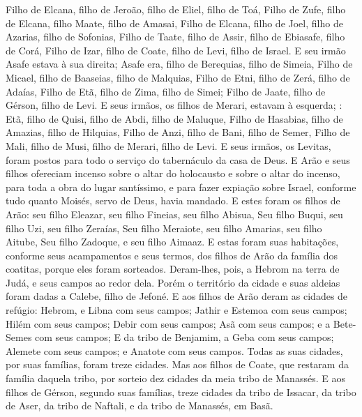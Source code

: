 {  Filho de Elcana, filho de Jeroão, filho de Eliel, filho de Toá,
  Filho de Zufe, filho de Elcana, filho Maate, filho de Amasai,
  Filho de Elcana, filho de Joel, filho de Azarias, filho de Sofonias,
  Filho de Taate, filho de Assir, filho de Ebiasafe, filho de Corá,
  Filho de Izar, filho de Coate, filho de Levi, filho de Israel.
  E seu irmão Asafe estava à sua direita; Asafe era, filho de Berequias, filho de Simeia,
  Filho de Micael, filho de Baaseias, filho de Malquias,
  Filho de Etni, filho de Zerá, filho de Adaías,
  Filho de Etã, filho de Zima, filho de Simei;
  Filho de Jaate, filho de Gérson, filho de Levi.
  E seus irmãos, os filhos de Merari, estavam à esquerda; {}: Etã, filho de Quisi, filho de Abdi, filho de Maluque,
  Filho de Hasabias, filho de Amazias, filho de Hilquias,
  Filho de Anzi, filho de Bani, filho de Semer,
  Filho de Mali, filho de Musi, filho de Merari, filho de Levi.
  E seus irmãos, os Levitas, foram postos para todo o serviço do tabernáculo da casa de Deus.
  E Arão e seus filhos ofereciam incenso sobre o altar do holocausto e sobre o altar do incenso, para toda a obra do lugar santíssimo, e para fazer expiação sobre Israel, conforme tudo quanto Moisés, servo de Deus, havia mandado.
  E estes foram os filhos de Arão: seu filho Eleazar, seu filho Fineias, seu filho Abisua,
  Seu filho Buqui, seu filho Uzi, seu filho Zeraías,
  Seu filho Meraiote, seu filho Amarias, seu filho Aitube,
  Seu filho Zadoque, e seu filho Aimaaz.
  E estas foram suas habitações, conforme seus acampamentos e seus termos, dos filhos de Arão da família dos coatitas, porque eles foram sorteados.
  Deram-lhes, pois, a Hebrom na terra de Judá, e seus campos ao redor dela.
  Porém o território da cidade e suas aldeias foram dadas a Calebe, filho de Jefoné.
  E aos filhos de Arão deram as {} cidades de refúgio: Hebrom, e Libna com seus campos; Jathir e Estemoa com seus campos;
  Hilém com seus campos; Debir com seus campos;
  Asã com seus campos; e a Bete-Semes com seus campos;
  E da tribo de Benjamim, a Geba com seus campos; Alemete com seus campos; e Anatote com seus campos. Todas as suas cidades, {} por suas famílias, foram treze cidades.
  Mas aos filhos de Coate, que restaram da família daquela tribo, {} por sorteio dez cidades da meia tribo de Manassés.
  E aos filhos de Gérson, segundo suas famílias, {} treze cidades da tribo de Issacar, da tribo de Aser, da tribo de Naftali, e da tribo de Manassés, em Basã.
}
